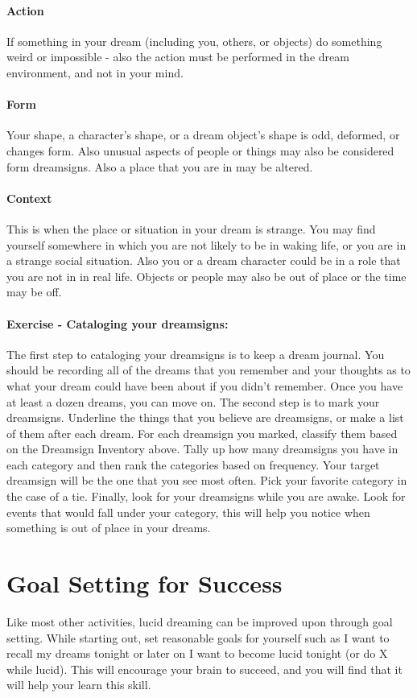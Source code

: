 \documentclass{report}
\begin{document}
\paragraph{Action} If something in your dream (including you, others, or objects) do something weird or impossible - also the action must be performed in the dream environment, and not in your mind.

\paragraph{Form} Your shape, a character's shape, or a dream object's shape is odd, deformed, or changes form. Also unusual aspects of people or things may also be considered form dreamsigns. Also a place that you are in may be altered.


\paragraph{Context} This is when the place or situation in your dream is strange. You may find yourself somewhere in which you are not likely to be in waking life, or you are in a strange social situation. Also you or a dream character could be in a role that you are not in in real life. Objects or people may also be out of place or the time may be off.

\paragraph{Exercise - Cataloging your dreamsigns:} The first step to cataloging your dreamsigns is to keep a dream journal. You should be recording all of the dreams that you remember and your thoughts as to what your dream could have been about if you didn't remember. Once you have at least a dozen dreams, you can move on. The second step is to mark your dreamsigns. Underline the things that you believe are dreamsigns, or make a list of them after each dream. For each dreamsign you marked, classify them based on the Dreamsign Inventory above. Tally up how many dreamsigns you have in each category and then rank the categories based on frequency. Your target dreamsign will be the one that you see most often. Pick your favorite category in the case of a tie. Finally, look for your dreamsigns while you are awake. Look for events that would fall under your category, this will help you notice when something is out of place in your dreams.

\section{Goal Setting for Success}
Like most other activities, lucid dreaming can be improved upon through goal setting. While starting out, set reasonable goals for yourself such as I want to recall my dreams tonight or later on I want to become lucid tonight (or do X while lucid). This will encourage your brain to succeed, and you will find that it will help your learn this skill.
\end{document}
